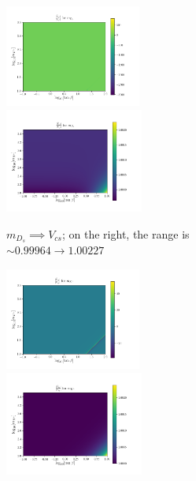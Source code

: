 \documentclass[11pt]{article}
\begin{document}
\newpage
\begin{figure}[H]\ContinuedFloat
    \centering
    \begin{subfigure}[b]{\textwidth}
        \includegraphics[width=0.49\textwidth]{heatmaps/mDs-rH0.png}
        \includegraphics[width=0.5\textwidth]{heatmaps/mDs-rH1.png}
        \caption{$m_{D_s} \implies V_{cs}$; on the right, the range is $\sim0.99964\to1.00227$}
    \end{subfigure}
    \begin{subfigure}[b]{\textwidth}
        \includegraphics[width=0.49\textwidth]{heatmaps/mK-rH0.png}
        \includegraphics[width=0.5\textwidth]{heatmaps/mK-rH1.png}

\end{subfigure}
\end{figure}
\end{document}
